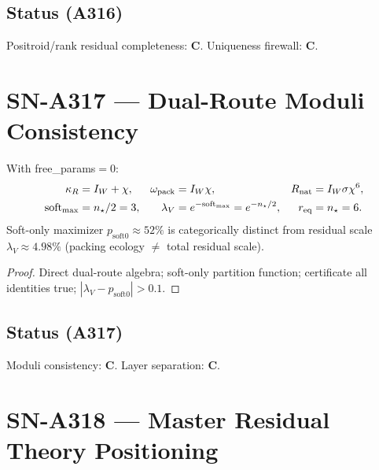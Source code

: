 \subsection*{Status (A316)}
Positroid/rank residual completeness: \textbf{C}. Uniqueness firewall: \textbf{C}.

\section{SN-A317 --- Dual-Route Moduli Consistency}
\label{sec:SN-A317}

\begin{theorem}
\label{thm:A317}
With free\_params${=}0$:
\begin{equation}
\begin{aligned}
\kappa_R&=I_W+\chi,&
\omega_{\mathrm{pack}}&=I_W\chi,&
R_{\rm nat}&=I_W\sigma\chi^6,\\
\mathrm{soft}_{\max}&=n_\star/2=3,&
\lambda_V&=e^{-\mathrm{soft}_{\max}}=e^{-n_\star/2},&
r_{\mathrm{eq}}&=n_\star=6.
\end{aligned}
\end{equation}
Soft-only maximizer $p_{\mathrm{soft0}}\approx 52\%$ is categorically distinct from residual scale
$\lambda_V\approx 4.98\%$ (packing ecology $\neq$ total residual scale).
\end{theorem}

\begin{proof}
Direct dual-route algebra; soft-only partition function; certificate all identities true;
$|\lambda_V-p_{\mathrm{soft0}}|>0.1$.
\end{proof}

\subsection*{Status (A317)}
Moduli consistency: \textbf{C}. Layer separation: \textbf{C}.

\section{SN-A318 --- Master Residual Theory Positioning}
\label{sec:SN-A318}

